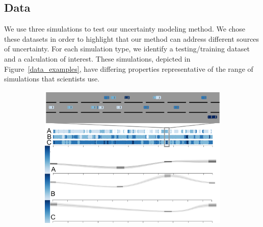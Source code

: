 \subsection{Data}
\label{data}

We use three simulations to test our uncertainty modeling method. We chose these datasets in order to highlight that our method can address different sources of uncertainty. For each simulation type, we identify a testing/training dataset and a calculation of interest. These simulations, depicted in Figure~\ref{data_examples}, have differing properties representative of the range of simulations that scientists use.


\begin{figure}[h]
    \centering
    \begin{subfigure}{0.31\textwidth}
        \caption{}
        \label{illustris_example}
    \end{subfigure}
    \begin{subfigure}{0.32\textwidth}
        \includegraphics[width=\textwidth]{images/sampling/traffic_example_updated.png}

\end{subfigure}
\end{figure}
